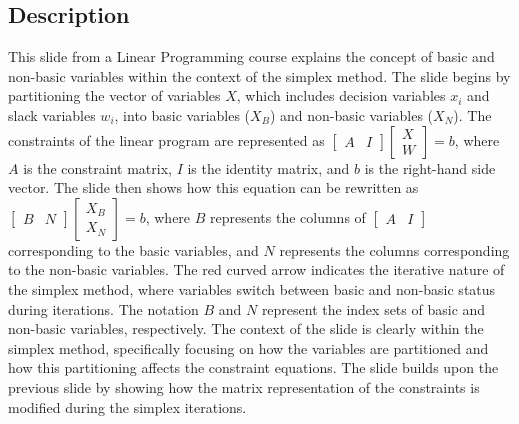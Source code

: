 \documentclass{article}%
\begin{document}
\subsection{Description}%
This slide from a Linear Programming course explains the concept of basic and non-basic variables within the context of the simplex method. The slide begins by partitioning the vector of variables $X$, which includes decision variables $x_i$ and slack variables $w_i$, into basic variables ($X_B$) and non-basic variables ($X_N$). The constraints of the linear program are represented as $\begin{bmatrix} A & I \end{bmatrix} \begin{bmatrix} X \\ W \end{bmatrix} = b$, where $A$ is the constraint matrix, $I$ is the identity matrix, and $b$ is the right-hand side vector.  The slide then shows how this equation can be rewritten as $\begin{bmatrix} B & N \end{bmatrix} \begin{bmatrix} X_B \\ X_N \end{bmatrix} = b$, where $B$ represents the columns of $\begin{bmatrix} A & I \end{bmatrix}$ corresponding to the basic variables, and $N$ represents the columns corresponding to the non-basic variables. The red curved arrow indicates the iterative nature of the simplex method, where variables switch between basic and non-basic status during iterations. The notation $B$ and $N$ represent the index sets of basic and non-basic variables, respectively. The context of the slide is clearly within the simplex method, specifically focusing on how the variables are partitioned and how this partitioning affects the constraint equations. The slide builds upon the previous slide by showing how the matrix representation of the constraints is modified during the simplex iterations.%
\end{document}
